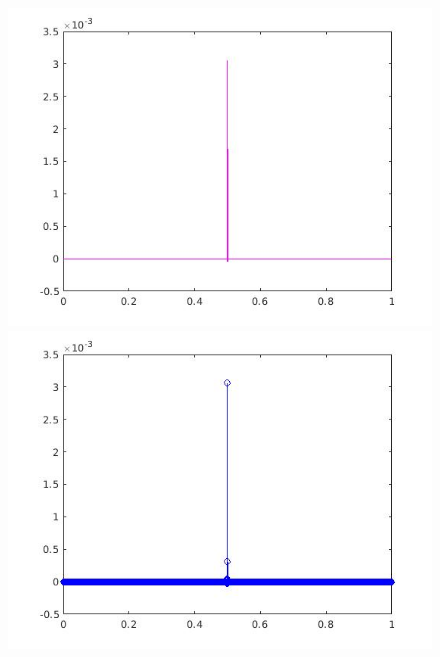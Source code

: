 \documentclass[a4paper,11pt]{article}
\begin{document}
\begin{figure}[!hp]
\centering
\begin{minipage}{.5\textwidth}
  \centering
  \includegraphics[width=1\linewidth]{images/lab2_15.jpg}
\end{minipage}%
\begin{minipage}{.5\textwidth}
  \centering
  \includegraphics[width=1\linewidth]{images/lab2_16.jpg}
\end{minipage}
\end{figure}
\end{document}
